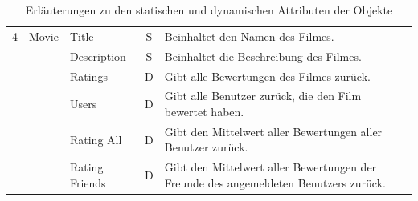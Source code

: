 \begin{table}[ht]
\begin{center}
\begin{tabular}{lllcp{9cm}l}
        \midrule
            4 & Movie & Title & S & Beinhaltet den Namen des Filmes. \\
            & & Description & S & Beinhaltet die Beschreibung des Filmes. \\
            & & Ratings & D & Gibt alle Bewertungen des Filmes zurück. \\
            & & Users & D & Gibt alle Benutzer zurück, die den Film bewertet haben. \\
            & & Rating All & D & Gibt den Mittelwert aller Bewertungen aller Benutzer zurück. \\
            & & Rating Friends & D & Gibt den Mittelwert aller Bewertungen der Freunde des 
                                 angemeldeten Benutzers zurück. \\
        \bottomrule
    \end{tabular}
    \caption{Erläuterungen zu den statischen und dynamischen Attributen der Objekte}
    \label{tab:attribute}
\end{center}
\end{table}
